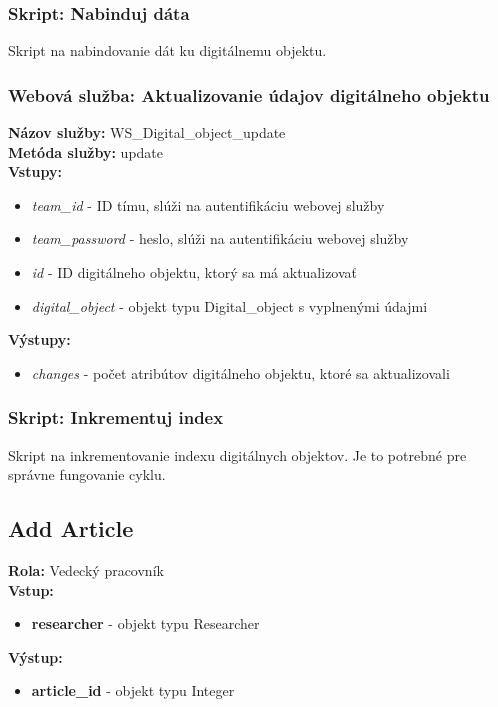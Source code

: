 \documentclass[10pt,oneside,slovak,a4paper]{article}
\begin{document}
\subsubsection{Skript: Nabinduj dáta}
Skript na nabindovanie dát ku digitálnemu objektu.

\subsubsection{Webová služba: Aktualizovanie údajov digitálneho objektu}
\textbf{Názov služby:} WS\_Digital\_object\_update\\
\textbf{Metóda služby:} update\\
\textbf{Vstupy:}
	\begin{itemize}
		\item \textit{team\_id} - ID tímu, slúži na autentifikáciu webovej služby
		\item \textit{team\_password} - heslo, slúži na autentifikáciu webovej služby
		\item \textit{id} - ID digitálneho objektu, ktorý sa má aktualizovať
		\item \textit{digital\_object} - objekt typu Digital\_object s vyplnenými údajmi
	\end{itemize}
\textbf{Výstupy:}
	\begin{itemize}
		\item \textit{changes} - počet atribútov digitálneho objektu, ktoré sa aktualizovali
	\end{itemize}
	
\subsubsection{Skript: Inkrementuj index}
Skript na inkrementovanie indexu digitálnych objektov. Je to potrebné pre správne fungovanie cyklu.

\subsection{Add Article}

\textbf{Rola:} Vedecký pracovník\\
\textbf{Vstup:}

\begin{itemize}
\item \textbf{researcher} - objekt typu Researcher \\ 
\end{itemize}

\textbf{Výstup:}
\begin{itemize}
\item \textbf{article{\_}id} - objekt typu Integer
\end{itemize}
\end{document}
